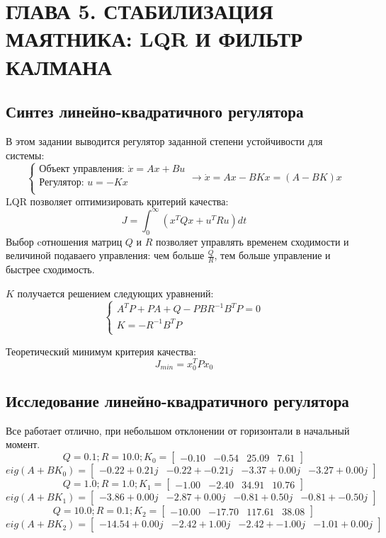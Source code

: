 \section{ГЛАВА 5. СТАБИЛИЗАЦИЯ МАЯТНИКА: LQR И ФИЛЬТР КАЛМАНА}

\subsection{Синтез линейно-квадратичного регулятора}
В этом задании выводится регулятор заданной степени устойчивости для системы:
\[
        \begin{cases}
                \text{Объект управления: }\dot{x} = A x + Bu \\
                \text{Регулятор: }u = -K x \\
        \end{cases} \rightarrow
        \dot{x} = A x - BKx = (A-BK)x
\]
LQR позволяет оптимизировать критерий качества:
\[J = \int_0^\infty (x^T Q x + u^T R u)dt \]
Выбор cотношения матриц \(Q\) и \(R\) позволяет управлять временем сходимости и величиной подаваего управления: чем больше \(\frac{Q}{R}\), тем больше управление и быстрее сходимость.

\(K\) получается решением следующих уравнений:
\[
\begin{cases}
    A^T P + P A + Q - PBR^{-1}B^TP = 0\\
    K = -R^{-1} B^T P \\
\end{cases}
\]

Теоретический минимум критерия качества:
\[J_{min} = x_0^T P x_0\]
\FloatBarrier

\subsection{Исследование линейно-квадратичного регулятора}
Все работает отлично, при небольшом отклонении от горизонтали в начальный момент.
\[Q = 0.1; R = 10.0; K_0 = \begin{bmatrix}
        -0.10 & -0.54 &  25.09 &  7.61
       \end{bmatrix}\]
       \[eig(A+BK_0) = \begin{bmatrix}
        -0.22 + 0.21j & -0.22 + -0.21j & -3.37 + 0.00j & -3.27 + 0.00j
       \end{bmatrix}\]
       \[Q = 1.0; R = 1.0; K_1 = \begin{bmatrix}
        -1.00 & -2.40 &  34.91 &  10.76
       \end{bmatrix}\]
       \[eig(A+BK_1) = \begin{bmatrix}
        -3.86 + 0.00j & -2.87 + 0.00j & -0.81 + 0.50j & -0.81 + -0.50j
       \end{bmatrix}\]
       \[Q = 10.0; R = 0.1; K_2 = \begin{bmatrix}
        -10.00 & -17.70 &  117.61 &  38.08
       \end{bmatrix}\]
       \[eig(A+BK_2) = \begin{bmatrix}
        -14.54 + 0.00j & -2.42 + 1.00j & -2.42 + -1.00j & -1.01 + 0.00j
       \end{bmatrix}\]

